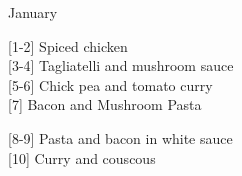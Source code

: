 
    
		\begin{menu}{January}
    
    \begin{recipelist}
    
        {\scriptsize[1-2]} Spiced chicken\\
        {\scriptsize[3-4]} Tagliatelli and mushroom sauce\\
        {\scriptsize[5-6]} Chick pea and tomato curry\\
        {\scriptsize[7]} Bacon and Mushroom Pasta\\%
    \end{recipelist}%
    \begin{recipelist}
    
        {\scriptsize[8-9]} Pasta and bacon in white sauce\\
        {\scriptsize[10]} Curry and couscous\\
    \end{recipelist}\par%
  

\end{menu}

